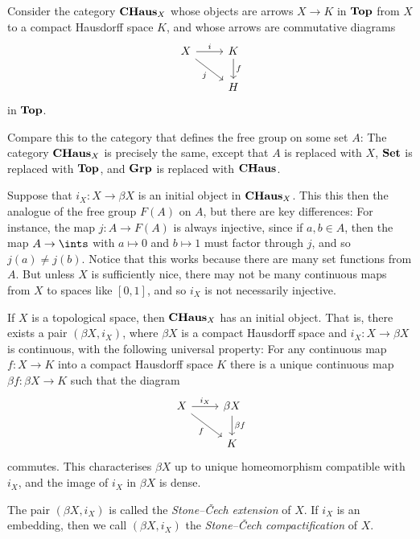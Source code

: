 \documentclass[article, a4paper, 11pt, oneside]{memoir}
\numberwithin{equation}{chapter}
\begin{document}
Consider the category $\mathbf{CHaus}_X$ whose objects are arrows $X \to K$ in $\mathbf{Top}$ from $X$ to a compact Hausdorff space $K$, and whose arrows are commutative diagrams
%
\begin{equation*}
    \begin{tikzcd}
        X
            \ar[r, "i"]
            \ar[dr, "j", swap]
        & K
            \ar[d, "f"]
        \\
        & H
    \end{tikzcd}
\end{equation*}
%
in $\mathbf{Top}$.

Compare this to the category that defines the free group on some set $A$: The category $\mathbf{CHaus}_X$ is precisely the same, except that $A$ is replaced with $X$, $\mathbf{Set}$ is replaced with $\mathbf{Top}$, and $\mathbf{Grp}$ is replaced with $\mathbf{CHaus}$.

Suppose that $i_X \colon X \to \beta X$ is an initial object in $\mathbf{CHaus}_X$. This this then the analogue of the free group $F(A)$ on $A$, but there are key differences: For instance, the map $j \colon A \to F(A)$ is always injective, since if $a,b \in A$, then the map $A \to \ints$ with $a \mapsto 0$ and $b \mapsto 1$ must factor through $j$, and so $j(a) \neq j(b)$. Notice that this works because there are many set functions from $A$. But unless $X$ is sufficiently nice, there may not be many continuous maps from $X$ to spaces like $[0,1]$, and so $i_X$ is not necessarily injective.

\begin{theorem}
    If $X$ is a topological space, then $\mathbf{CHaus}_X$ has an initial object. That is, there exists a pair $(\beta X,i_X)$, where $\beta X$ is a compact Hausdorff space and $i_X \colon X \to \beta X$ is continuous, with the following universal property: For any continuous map $f \colon X \to K$ into a compact Hausdorff space $K$ there is a unique continuous map $\beta f \colon \beta X \to K$ such that the diagram
    \begin{equation*}
        \begin{tikzcd}
            X
                \ar[r, "i_X"]
                \ar[dr, "f", swap]
            & \beta X
                \ar[d, "\beta f"]
            \\
            & K
        \end{tikzcd}
    \end{equation*}
    commutes. This characterises $\beta X$ up to unique homeomorphism compatible with $i_X$, and the image of $i_X$ in $\beta X$ is dense.
\end{theorem}
%
The pair $(\beta X,i_X)$ is called the \emph{Stone--\v{C}ech extension} of $X$. If $i_X$ is an embedding, then we call $(\beta X,i_X)$ the \emph{Stone--\v{C}ech compactification} of $X$.
\end{document}
